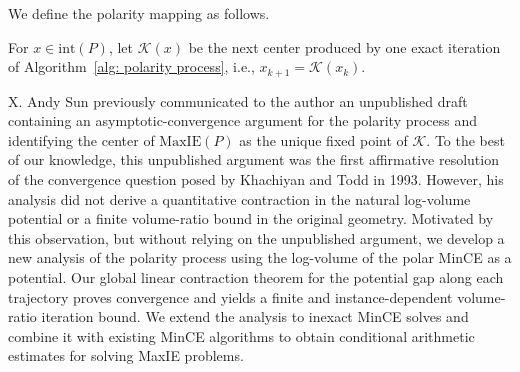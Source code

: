 \documentclass[smallextended]{svjour3}
\newcommand{\K}{\mathcal{K}}
\newcommand{\MaxIE}{\mathrm{MaxIE}}
\begin{document}
We define the polarity mapping as follows. 
\begin{definition}
For $x\in\mathrm{int}(P)$, let $\K(x)$ be the next center produced by one exact
iteration of Algorithm~\ref{alg: polarity process}, i.e., $x_{k+1}=\K(x_k)$.
\end{definition}

X. Andy Sun previously communicated to the author an unpublished draft containing an asymptotic-convergence argument for the polarity process and identifying the center of $\MaxIE(P)$ as the unique fixed point of $\K$. 
To the best of our knowledge, this unpublished argument was the first affirmative resolution of the convergence question posed by Khachiyan and Todd in 1993.
However, his analysis did not derive a quantitative contraction in the natural log-volume potential or a finite volume-ratio bound in the original geometry.
Motivated by this observation, but without relying on the unpublished argument, we develop a new analysis of the polarity process using the
log-volume of the polar MinCE as a potential. Our global linear contraction theorem for the potential gap along each trajectory
proves convergence and yields a finite and instance-dependent volume-ratio
iteration bound. We extend the analysis to inexact MinCE solves and combine it
with existing MinCE algorithms to obtain conditional arithmetic estimates for solving MaxIE problems.
\end{document}
